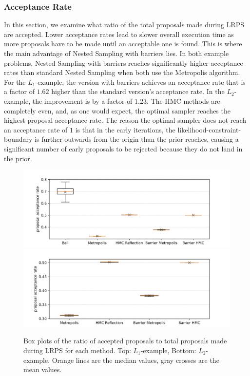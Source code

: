 \documentclass[12pt, a4paper]{report}
\begin{document}
\subsubsection{Acceptance Rate}
In this section, we examine what ratio of the total proposals made during LRPS are accepted.
Lower acceptance rates lead to slower overall execution time as more proposals have to be made until an acceptable one is found.
This is where the main advantage of Nested Sampling with barriers lies.
In both example problems, Nested Sampling with barriers reaches significantly higher acceptance rates than standard Nested Sampling when both use the Metropolis algorithm.
For the $L_1$-example, the version with barriers achieves an acceptance rate that is a factor of $1.62$ higher than the standard version's acceptance rate.
In the $L_2$-example, the improvement is by a factor of $1.23$.
The HMC methods are completely even, and, as one would expect, the optimal sampler reaches the highest proposal acceptance rate.
The reason the optimal sampler does not reach an acceptance rate of $1$ is that in the early iterations, the likelihood-constraint-boundary is further outwards from the origin than the prior reaches, causing a significant number of early proposals to be rejected because they do not land in the prior.
\begin{figure}
    \centering
    \includegraphics[scale=0.4]{figs/results/acceptance_rates_spike_20d.png}
    \includegraphics[scale=0.4]{figs/results/acceptance_rates_spike_offcenter_20d.png}
    \caption{Box plots of the ratio of accepted proposals to total proposals made during LRPS for each method. Top: $L_1$-example, Bottom: $L_2$-example. Orange lines are the median values, gray crosses are the mean values.}
    \label{fig:results_acceptance_rates}
\end{figure}
\end{document}
